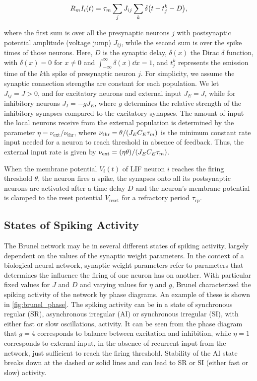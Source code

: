 \begin{equation}
    R_m I_i (t) = \tau_m \sum_j J_{ij} \sum_k \delta \qty(t - t_j^k - D),
\end{equation}

where the first sum is over all the presynaptic neurons $j$ with postsynaptic potential amplitude (voltage jump) $J_{ij}$, while the second sum is over the spike times of those neurons. Here, $D$ is the synaptic delay, $\delta(x)$ the Dirac $\delta$ function, with $\delta(x)=0$ for $x \neq 0$ and $\int_{-\infty}^\infty \delta (x) \dd{x} = 1$, and $t_j^k$ represents the emission time of the $k$th spike of presynaptic neuron $j$. For simplicity, we assume the synaptic connection strengths are constant for each population. We let $J_{ij}=J>0$, and for excitatory neurons and external input $J_E = J$, while for inhibitory neurons $J_I = -g J_E$, where $g$ determines the relative strength of the inhibitory synapses compared to the excitatory synapses. The amount of input the local neurons receive from the external population is determined by the parameter $\eta = \nu_\mathrm{ext}/\nu_\mathrm{thr}$, where $\nu_\mathrm{thr} = \theta / \qty(J_E C_E \tau_m)$ is the minimum constant rate input needed for a neuron to reach threshold in absence of feedback. Thus, the external input rate is given by $\nu_\mathrm{ext} = \qty(\eta \theta) / \qty(J_E C_E \tau_m)$.  

When the membrane potential $V_i (t)$ of LIF neuron $i$ reaches the firing threshold $\theta$, the neuron fires a spike, the synapses onto all its postsynaptic neurons are activated after a time delay $D$ and the neuron's membrane potential is clamped to the reset potential $V_\mathrm{reset}$ for a refractory period $\tau_\mathrm{rp}$.


\subsection{States of Spiking Activity}

The Brunel network may be in several different states of spiking activity, largely dependent on the values of the synaptic weight parameters. In the context of a biological neural network, synaptic weight parameters refer to parameters that determines the influence the firing of one neuron has on another. With particular fixed values for $J$ and $D$ and varying values for $\eta$ and $g$, Brunel \cite{Brunel2000} characterized the spiking activity of the network by phase diagrams. An example of these is shown in \autoref{fig:brunel_phase}. The spiking activity can be in a state of synchronous regular (SR), asynchronous irregular (AI) or synchronous irregular (SI), with either fast or slow oscillations, activity. It can be seen from the phase diagram that $g=4$ corresponds to balance between excitation and inhibition, while $\eta=1$ corresponds to external input, in the absence of recurrent input from the network, just sufficient to reach the firing threshold. Stability of the AI state breaks down at the dashed or solid lines and can lead to SR or SI (either fast or slow) activity.

